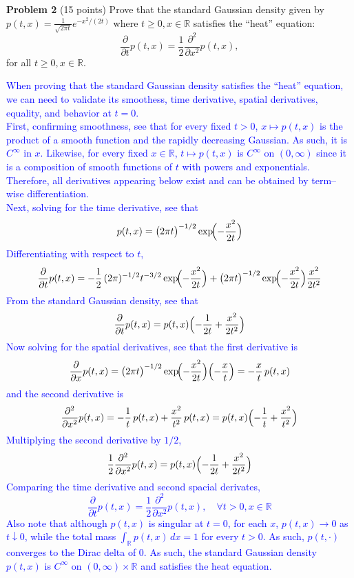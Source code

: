 \documentclass{article}
\begin{document}
\textbf{Problem 2}   (15 points) Prove that the standard Gaussian density given by 
$p(t, x) = \frac{1}{\sqrt{2\pi t}} e^{-x^2/(2t)}$
where $t \geq 0, x \in \mathbb{R}$ satisfies the “heat” equation:
$$\frac{\partial}{\partial t}p(t, x) = \frac{1}{2} \frac{\partial^2}{\partial x^2} p(t, x),$$
for all $t \geq 0, x \in \mathbb{R}$.


\textcolor{blue}{
When proving that the standard Gaussian density satisfies the ``heat'' equation, we can need to validate its smoothess, time derivative, spatial derivatives, equality, and behavior at $t=0$. \\
First, confirming smoothness, see that
for every fixed \(t>0\), \(x\mapsto p(t,x)\) is the product of a smooth function and the rapidly decreasing Gaussian. As such, it is \(C^{\infty}\) in \(x\).
Likewise, for every fixed \(x\in\mathbb{R}\), \(t\mapsto p(t,x)\) is \(C^{\infty}\) on \((0,\infty)\) since it is a composition of smooth functions of \(t\) with powers and exponentials.
Therefore, all derivatives appearing below exist and can be obtained by term–wise differentiation. \\
Next, solving for the time derivative, see that
$$
p(t,x)=\bigl(2\pi t\bigr)^{-1/2}\exp\!\Bigl(-\frac{x^{2}}{2t}\Bigr)
$$
Differentiating with respect to \(t\),
$$
\frac{\partial}{\partial t}p(t,x)
=
-\frac12\,(2\pi)^{-1/2}t^{-3/2}\exp\!\Bigl(-\frac{x^{2}}{2t}\Bigr)
+\bigl(2\pi t\bigr)^{-1/2}\exp\!\Bigl(-\frac{x^{2}}{2t}\Bigr)\frac{x^{2}}{2t^{2}}
$$
From the standard Gaussian density, see that
$$
\frac{\partial}{\partial t}p(t,x)=p(t,x)\Bigl(-\frac1{2t}+\frac{x^{2}}{2t^{2}}\Bigr)
$$
Now solving for the spatial derivatives, see that the
first derivative is
$$
\frac{\partial}{\partial x}p(t,x)
=
\bigl(2\pi t\bigr)^{-1/2}\exp\!\Bigl(-\frac{x^{2}}{2t}\Bigr)\Bigl(-\frac{x}{t}\Bigr)
=
-\frac{x}{t}\,p(t,x)
$$
and the second derivative is
$$
\frac{\partial^{2}}{\partial x^{2}}p(t,x)
=
-\frac1{t}\,p(t,x)+\frac{x^{2}}{t^{2}}\,p(t,x)
=
p(t,x)\Bigl(-\frac1{t}+\frac{x^{2}}{t^{2}}\Bigr)
$$
Multiplying the second derivative by \(1/2\),
$$
\frac12\frac{\partial^{2}}{\partial x^{2}}p(t,x)
=
p(t,x)\Bigl(-\frac1{2t}+\frac{x^{2}}{2t^{2}}\Bigr)
$$
Comparing the time derivative and second spacial derivates,
$$
\frac{\partial}{\partial t}p(t,x)=\frac12\frac{\partial^{2}}{\partial x^{2}}p(t,x), \quad \forall t > 0, x \in \mathbb{R}
$$
Also note that although \(p(t,x)\) is singular at \(t=0\), 
for each \(x\),
\(p(t,x)\to0\) as \(t\downarrow0\), while the total mass
\(\int_{\mathbb{R}}p(t,x)\,dx=1\) for every \(t>0\). As such, \(p(t,\cdot)\) converges to the Dirac delta of 0.
As such, the standard Gaussian density \(p(t,x)\) is \(C^{\infty}\) on \((0,\infty)\times\mathbb{R}\) and satisfies the heat equation.
}
\end{document}
